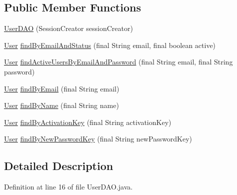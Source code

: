 \subsection*{Public Member Functions}
\begin{DoxyCompactItemize}
\item 
\hyperlink{classbr_1_1usp_1_1cata_1_1dao_1_1_user_d_a_o_ae83c8d26b4a8b3cb4d3f27a284a59264}{User\+D\+A\+O} (Session\+Creator session\+Creator)
\item 
\hyperlink{classbr_1_1usp_1_1cata_1_1model_1_1_user}{User} \hyperlink{classbr_1_1usp_1_1cata_1_1dao_1_1_user_d_a_o_a5878406a0750b28eb447df1d3f705a2d}{find\+By\+Email\+And\+Status} (final String email, final boolean active)
\item 
\hyperlink{classbr_1_1usp_1_1cata_1_1model_1_1_user}{User} \hyperlink{classbr_1_1usp_1_1cata_1_1dao_1_1_user_d_a_o_a1a31dcd6f1118562f73c2d381b1bf40b}{find\+Active\+Users\+By\+Email\+And\+Password} (final String email, final String password)
\item 
\hyperlink{classbr_1_1usp_1_1cata_1_1model_1_1_user}{User} \hyperlink{classbr_1_1usp_1_1cata_1_1dao_1_1_user_d_a_o_af3228cdacc3986df3b507ff38901810e}{find\+By\+Email} (final String email)
\item 
\hyperlink{classbr_1_1usp_1_1cata_1_1model_1_1_user}{User} \hyperlink{classbr_1_1usp_1_1cata_1_1dao_1_1_user_d_a_o_a808114b1b2d26ad37392791aeccfeb9c}{find\+By\+Name} (final String name)
\item 
\hyperlink{classbr_1_1usp_1_1cata_1_1model_1_1_user}{User} \hyperlink{classbr_1_1usp_1_1cata_1_1dao_1_1_user_d_a_o_ac69c9650ff962a3747c78fb6d6149e6e}{find\+By\+Activation\+Key} (final String activation\+Key)
\item 
\hyperlink{classbr_1_1usp_1_1cata_1_1model_1_1_user}{User} \hyperlink{classbr_1_1usp_1_1cata_1_1dao_1_1_user_d_a_o_afa1e14c4082f89102948f24320217d10}{find\+By\+New\+Password\+Key} (final String new\+Password\+Key)
\end{DoxyCompactItemize}


\subsection{Detailed Description}


Definition at line 16 of file User\+D\+A\+O.\+java.



